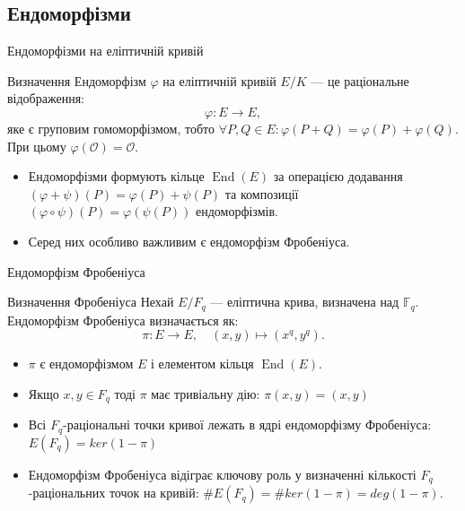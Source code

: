 \documentclass[9pt]{beamer}
\begin{document}
\begin{darkframes}
\section{Ендоморфізми}
\begin{frame}{Ендоморфізми на еліптичній кривій}
  \begin{block}{Визначення}
    Ендоморфізм \( \varphi \) на еліптичній кривій \(E/K\) --- це раціональне відображення:
    \[
    \varphi: E \to E,
    \]
    яке є груповим гомоморфізмом, тобто $\forall P,Q \in E: \varphi(P+Q)=\varphi(P)+\varphi(Q)$. При цьому $\varphi(\mathcal{O})=\mathcal{O}$.
  \end{block}
  \vspace{0.3cm}
  \begin{itemize}
    \item Ендоморфізми формують кільце \(\operatorname{End}(E)\) за операцією додавання $(\varphi+\psi)(P) = \varphi(P)+\psi(P)$ та композиції $(\varphi \circ \psi)(P) = \varphi(\psi(P))$ ендоморфізмів.
    \item Серед них особливо важливим є ендоморфізм Фробеніуса.
  \end{itemize}
\end{frame}

\begin{frame}{Ендоморфізм Фробеніуса}
  \begin{block}{Визначення Фробеніуса}
    Нехай \(E/F_q\) --- еліптична крива, визначена над \(\mathbb{F}_q\). Ендоморфізм Фробеніуса визначається як:
    \[
    \pi: E \to E,\quad (x,y) \mapsto (x^q, y^q).
    \]
  \end{block}
  \vspace{0.3cm}
  \begin{itemize}
    \item \(\pi\) є ендоморфізмом \(E\) і елементом кільця \(\operatorname{End}(E)\).
    \item Якщо $x,y \in F_q$ тоді $\pi$ має тривіальну дію: $\pi(x,y) = (x,y)$
    \item Всі $F_q$-раціональні точки кривої лежать в ядрі ендоморфізму Фробеніуса: $E(F_q) = ker(1-\pi)$
    \item Ендоморфізм Фробеніуса відіграє ключову роль у визначенні кількості $F_q$-раціональних точок на кривій: $\#E(F_q) = \# ker(1-\pi) = deg(1-\pi)$.
  \end{itemize}
\end{frame}


\end{darkframes}
\end{document}
